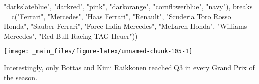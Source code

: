 \documentclass[
]{book}
\newenvironment{Shaded}{\begin{snugshade}}{\end{snugshade}}
\newcommand{\AttributeTok}[1]{\textcolor[rgb]{0.77,0.63,0.00}{#1}}
\newcommand{\FunctionTok}[1]{\textcolor[rgb]{0.00,0.00,0.00}{#1}}
\newcommand{\NormalTok}[1]{#1}
\newcommand{\StringTok}[1]{\textcolor[rgb]{0.31,0.60,0.02}{#1}}
\begin{document}
\begin{Shaded}
\begin{Highlighting}[]
                               \StringTok{"darkslateblue"}\NormalTok{, }
                                \StringTok{"darkred"}\NormalTok{,  }
                                \StringTok{"pink"}\NormalTok{, }
                                \StringTok{"darkorange"}\NormalTok{, }
                                \StringTok{"cornflowerblue"}\NormalTok{,}
                               \StringTok{"navy"}\NormalTok{),}
                     \AttributeTok{breaks =} \FunctionTok{c}\NormalTok{(}\StringTok{"Ferrari"}\NormalTok{,}
                                 \StringTok{"Mercedes"}\NormalTok{,}
                                 \StringTok{"Haas Ferrari"}\NormalTok{,}
                                 \StringTok{"Renault"}\NormalTok{,}
                                 \StringTok{"Scuderia Toro Rosso Honda"}\NormalTok{,}
                                 \StringTok{"Sauber Ferrari"}\NormalTok{, }
                                 \StringTok{"Force India Mercedes"}\NormalTok{,}
                                 \StringTok{"McLaren Honda"}\NormalTok{,}
                                 \StringTok{"Williams Mercedes"}\NormalTok{,}
                                 \StringTok{"Red Bull Racing TAG Heuer"}\NormalTok{))}
\end{Highlighting}
\end{Shaded}

\begin{center}\texttt{[image: \_main\_files/figure-latex/unnamed-chunk-105-1]} \end{center}

Interestingly, only Bottas and Kimi Raikkonen reached Q3 in every Grand Prix of the season.
\end{document}
